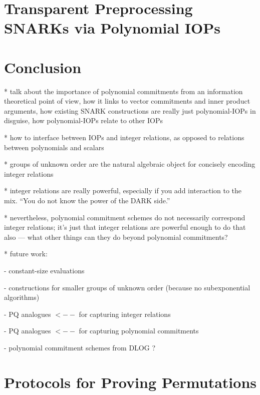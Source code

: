 \documentclass{article}
\theoremstyle{definition}
\begin{document}
\section{Transparent Preprocessing SNARKs via Polynomial IOPs}\label{sec:polyiop}


\section{Conclusion}

 * talk about the importance of polynomial commitments from an information theoretical point of view, how it links to vector commitments and inner product arguments, how existing SNARK constructions are really just polynomial-IOPs in disguise, how polynomial-IOPs relate to other IOPs
 
 * how to interface between IOPs and integer relations, as opposed to relations between polynomials and scalars 
 
 * groups of unknown order are the natural algebraic object for concisely encoding integer relations
 
 * integer relations are really powerful, especially if you add interaction to the mix. ``You do not know the power of the DARK side.''
 
 * nevertheless, polynomial commitment schemes do not necessarily correspond integer relations; it's just that integer relations are powerful enough to do that also --- what other things can they do beyond polynomial commitments?
 
 * future work:
 
  - constant-size evaluations
  
  - constructions for smaller groups of unknown order (because no subexponential algorithms)
  
  - PQ analogues $<--$ for capturing integer relations
  
  - PQ analogues $<--$ for capturing polynomial commitments
  
  - polynomial commitment schemes from DLOG ?

%

  

\appendix


\section{Protocols for Proving Permutations}
\end{document}

